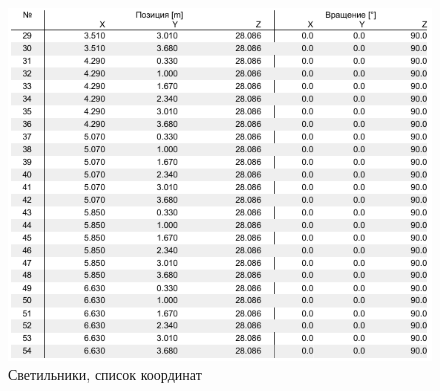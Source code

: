 \begin{figure}[p]
\centering
\includegraphics[width=\textwidth]{lights_5}
\caption{Светильники, список координат}
\label{pic:light_5}
\end{figure}
\clearpage
